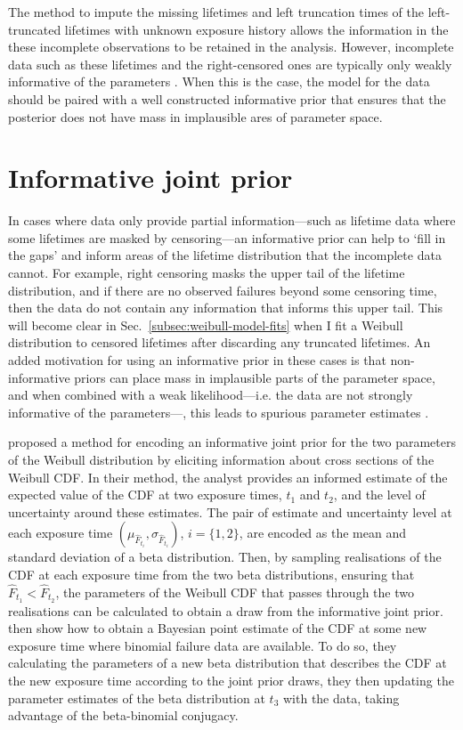 The method to impute the missing lifetimes and left truncation times of the left-truncated lifetimes with unknown exposure history allows the information in the these incomplete observations to be retained in the analysis. However, incomplete data such as these lifetimes and the right-censored ones are typically only weakly informative of the parameters \citep{tian2024}. When this is the case, the model for the data should be paired with a well constructed informative prior that ensures that the posterior does not have mass in implausible ares of parameter space. 

\section{Informative joint prior} \label{sec:weibull-joint-prior}

In cases where data only provide partial information---such as lifetime data where some lifetimes are masked by censoring---an informative prior can help to `fill in the gaps' and inform areas of the lifetime distribution that the incomplete data cannot. For example, right censoring masks the upper tail of the lifetime distribution, and if there are no observed failures beyond some censoring time, then the data do not contain any information that informs this upper tail. This will become clear in Sec.~\ref{subsec:weibull-model-fits} when I fit a Weibull distribution to censored lifetimes after discarding any truncated lifetimes. An added motivation for using an informative prior in these cases is that non-informative priors can place mass in implausible parts of the parameter space, and when combined with a weak likelihood---i.e. the data are not strongly informative of the parameters---, this leads to spurious parameter estimates \citep{tian2024}.

\citet{kaminskiy2005} proposed a method for encoding an informative joint prior for the two parameters of the Weibull distribution by eliciting information about cross sections of the Weibull CDF. In their method, the analyst provides an informed estimate of the expected value of the CDF at two exposure times, $t_1$ and $t_2$, and the level of uncertainty around these estimates. The pair of estimate and uncertainty level at each exposure time $(\mu_{\hat{F}_{t_i}}, \sigma_{\hat{F}_{t_i}})$, $i = \{1, 2\}$, are encoded as the mean and standard deviation of a beta distribution. Then, by sampling realisations of the CDF at each exposure time from the two beta distributions, ensuring that $\hat{F}_{t_1} < \hat{F}_{t_2}$, the parameters of the Weibull CDF that passes through the two realisations can be calculated to obtain a draw from the informative joint prior. \citet{kaminskiy2005} then show how to obtain a Bayesian point estimate of the CDF at some new exposure time where binomial failure data are available. To do so, they calculating the parameters of a new beta distribution that describes the CDF at the new exposure time according to the joint prior draws, they then updating the parameter estimates of the beta distribution at $t_3$ with the data, taking advantage of the beta-binomial conjugacy.

